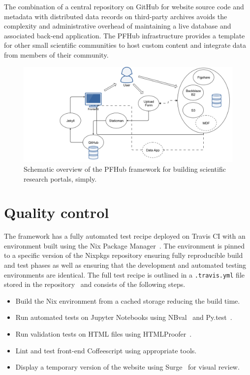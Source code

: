 \documentclass{jors}
\begin{document}
The combination of a central repository on GitHub for website source
code and metadata with distributed data records on third-party
archives avoids the complexity and administrative overhead of
maintaining a live database and associated back-end application. The
PFHub infrastructure provides a template for other small scientific
communities to host custom content and integrate data from members of
their community.

\begin{figure}
  \includegraphics[width=\textwidth]{pfhub_website.png}
  \caption{Schematic overview of the PFHub framework for building
    scientific research portals, simply.}
  \centering
  \label{fig:pfhub_website}
\end{figure}

\section*{Quality control}

The framework has a fully automated test recipe deployed on Travis CI
with an environment built using the Nix Package
Manager~\cite{nix}. The environment is pinned to a specific version of
the Nixpkgs repository ensuring fully reproducible build and test
phases as well as ensuring that the development and automated testing
environments are identical. The full test recipe is outlined in a
\texttt{.travis.yml} file stored in the repository~\cite{travisyml}
and consists of the following steps.

\begin{itemize}
  \item Build the Nix environment from a cached storage reducing the
    build time.
  \item Run automated tests on Jupyter Notebooks using
    NBval~\cite{nbval} and Py.test~\cite{pytest}.
  \item Run validation tests on HTML files using
    HTMLProofer~\cite{htmlproofer}.
  \item Lint and test front-end Coffeescript using appropriate tools.
  \item Display a temporary version of the website using
    Surge~\cite{surge} for visual review.
\end{itemize}
\end{document}

